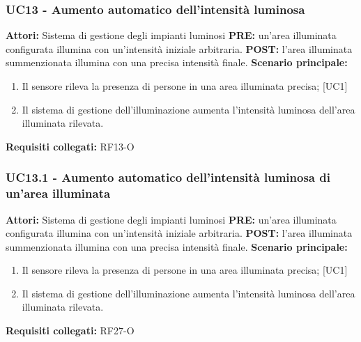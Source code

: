 \documentclass[a4paper, 12pt]{article}
\begin{document}
\subsubsection{UC13 - Aumento automatico dell'intensità luminosa}
\textbf{Attori:} Sistema di gestione degli impianti luminosi \newline
\textbf{PRE:} un'area illuminata configurata illumina con un'intensità iniziale arbitraria.\newline
\textbf{POST:} l'area illuminata summenzionata illumina con una precisa intensità finale.\newline
\textbf{Scenario principale:}
\begin{enumerate}
    \item Il sensore rileva la presenza di persone in una area illuminata precisa; [UC1]
    \item Il sistema di gestione dell'illuminazione aumenta l'intensità luminosa dell'area illuminata rilevata.
\end{enumerate}
\textbf{Requisiti collegati:} RF13-O\newline

\subsubsection{UC13.1 - Aumento automatico dell'intensità luminosa di un'area illuminata}
\textbf{Attori:} Sistema di gestione degli impianti luminosi \newline
\textbf{PRE:} un'area illuminata configurata illumina con un'intensità iniziale arbitraria.\newline
\textbf{POST:} l'area illuminata summenzionata illumina con una precisa intensità finale.\newline
\textbf{Scenario principale:}
\begin{enumerate}
    \item Il sensore rileva la presenza di persone in una area illuminata precisa; [UC1]
    \item Il sistema di gestione dell'illuminazione aumenta l'intensità luminosa dell'area illuminata rilevata.
\end{enumerate}
\textbf{Requisiti collegati:} RF27-O\newline
\end{document}
